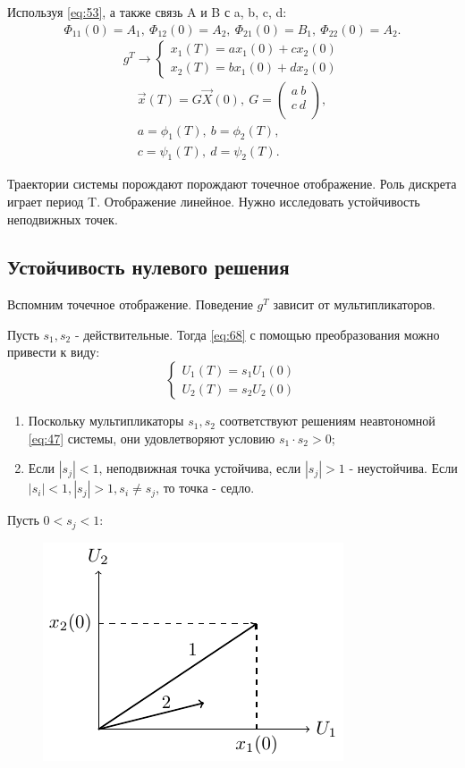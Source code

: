 Используя \eqref{eq:53}, а также связь A и B с a, b, c, d:
\begin{gather*}
	\Phi_{11}(0)=A_1,~\Phi_{12}(0)=A_2,~\Phi_{21}(0)=B_1,~\Phi_{22}(0)=A_2.	
\end{gather*}
\begin{equation}
	g^T\rightarrow
	\begin{cases}
		x_1(T)=a x_1(0)+c x_2(0) \\
		x_2(T)=b x_1(0)+d x_2(0)		
	\end{cases}
	\label{eq:68}
\end{equation}
\begin{gather*}
	\vec{x}(T)=G \vec{X}(0),~ G=
	\begin{pmatrix}
		a ~b \\
		c ~d \\
	\end{pmatrix}
	,\\
	a=\phi_1(T), ~ b=\phi_2(T), \\
	c=\psi_1(T), ~ d=\psi_2(T).
\end{gather*}

Траектории системы порождают порождают точечное отображение. Роль дискрета играет период T. Отображение линейное. Нужно исследовать устойчивость неподвижных точек. 
\subsection{Устойчивость нулевого решения}
Вспомним точечное отображение. Поведение $g^T$ зависит от мультипликаторов.

Пусть $s_1, s_2$ - действительные. Тогда \eqref{eq:68} с помощью преобразования можно привести к виду:
\begin{equation*}
	\begin{cases}
		U_1(T)=s_1 U_1(0) \\
		U_2(T)=s_2 U_2(0)		
	\end{cases}
\end{equation*}
\begin{enumerate} 
	\item Поскольку мультипликаторы $s_1, s_2$ соответствуют решениям неавтономной \eqref{eq:47} системы, они удовлетворяют условию $s_1\cdot s_2>0$;
	\item Если $|s_j|<1$, неподвижная точка устойчива, если $|s_j|>1$ - неустойчива. Если $|s_i|<1, |s_j|>1, s_i \neq s_j$, то точка - седло. 
\end{enumerate} 

Пусть $0<s_j<1$:
\begin{figure}[H]
	\centering
	\includegraphics[width=0.35\linewidth]{fig/fig34.pdf}   
\end{figure}

